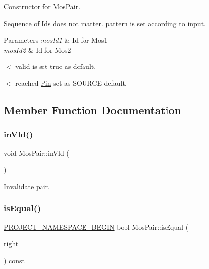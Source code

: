 Constructor for \hyperlink{classMosPair}{Mos\+Pair}. 

Sequence of Ids does not matter. pattern is set according to input.


\begin{DoxyParams}{Parameters}
{\em mos\+Id1} & Id for Mos1 \\
\hline
{\em mos\+Id2} & Id for Mos2 \\
\hline
\end{DoxyParams}
$<$ valid is set true as default.

$<$ reached \hyperlink{classPin}{Pin} set as S\+O\+U\+R\+CE default. 

\subsection{Member Function Documentation}
\mbox{\label{classMosPair_a3064a984676f0bd8e6d380a050bd2152}} 
\subsubsection{\texorpdfstring{in\+Vld()}{inVld()}}
{\footnotesize\ttfamily void Mos\+Pair\+::in\+Vld (\begin{DoxyParamCaption}{ }\end{DoxyParamCaption})\hspace{0.3cm}{\ttfamily [inline]}}



Invalidate pair. 

\mbox{\label{classMosPair_a4e4d694485bcc5c7c14981abef32774c}} 
\subsubsection{\texorpdfstring{is\+Equal()}{isEqual()}}
{\footnotesize\ttfamily \hyperlink{namespace_8h_ae48726a24dab2034454cf6d79e531eb8}{P\+R\+O\+J\+E\+C\+T\+\_\+\+N\+A\+M\+E\+S\+P\+A\+C\+E\+\_\+\+B\+E\+G\+IN} bool Mos\+Pair\+::is\+Equal (\begin{DoxyParamCaption}\item[{const \hyperlink{classMosPair}{Mos\+Pair} \&}]{right }\end{DoxyParamCaption}) const}



